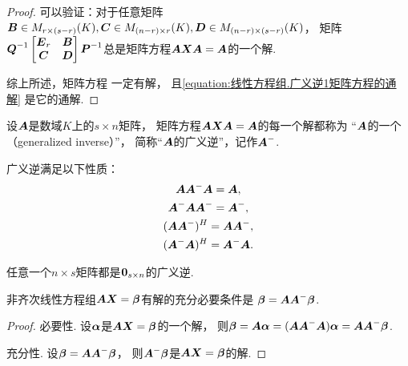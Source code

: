 \begin{theorem}[广义逆存在定理]
\begin{proof}
可以验证：对于任意矩阵\(
	\boldsymbol{B} \in M_{r \times (s-r)}(K),
	\boldsymbol{C} \in M_{(n-r) \times r}(K),
	\boldsymbol{D} \in M_{(n-r) \times (s-r)}(K)
\)，
矩阵\(
	\boldsymbol{Q}^{-1}
	\begin{bmatrix}
		\boldsymbol{E}_r & \boldsymbol{B} \\
		\boldsymbol{C} & \boldsymbol{D}
	\end{bmatrix}
	\boldsymbol{P}^{-1}
\)总是矩阵方程\(\boldsymbol{A} \boldsymbol{X} \boldsymbol{A} = \boldsymbol{A}\)的一个解.

综上所述，矩阵方程  一定有解，
且\cref{equation:线性方程组.广义逆1矩阵方程的通解} 是它的通解.
\end{proof}
\end{theorem}

\begin{definition}
设\(\boldsymbol{A}\)是数域\(K\)上的\(s \times n\)矩阵，
矩阵方程\(\boldsymbol{A} \boldsymbol{X} \boldsymbol{A} = \boldsymbol{A}\)的每一个解都称为
“\(\boldsymbol{A}\)的一个（generalized inverse）”，
简称“\(\boldsymbol{A}\)的广义逆”，记作\(\boldsymbol{A}^-\).
\end{definition}

\begin{property}\label{theorem:线性方程组.广义逆的性质1}
广义逆满足以下性质：\begin{gather}
	\boldsymbol{A}\boldsymbol{A}^-\boldsymbol{A}=\boldsymbol{A}, \\
	\boldsymbol{A}^-\boldsymbol{A}\boldsymbol{A}^-=\boldsymbol{A}^-, \\
	(\boldsymbol{A}\boldsymbol{A}^-)^H=\boldsymbol{A}\boldsymbol{A}^-, \\
	(\boldsymbol{A}^-\boldsymbol{A})^H=\boldsymbol{A}^-\boldsymbol{A}.
\end{gather}
\end{property}

\begin{property}\label{theorem:线性方程组.广义逆的性质2}
任意一个\(n \times s\)矩阵都是\(\boldsymbol0_{s \times n}\)的广义逆.
\end{property}

\begin{theorem}[非齐次线性方程组的相容性定理]\label{theorem:线性方程组.非齐次线性方程组的相容性定理}
非齐次线性方程组\(\boldsymbol{A} \boldsymbol{X} = \boldsymbol\beta\)有解的充分必要条件是
\(\boldsymbol\beta = \boldsymbol{A} \boldsymbol{A}^- \boldsymbol\beta\).
\begin{proof}
必要性.
设\(\boldsymbol\alpha\)是\(\boldsymbol{A} \boldsymbol{X} = \boldsymbol\beta\)的一个解，
则\(
	\boldsymbol\beta
	= \boldsymbol{A} \boldsymbol\alpha
	= (\boldsymbol{A} \boldsymbol{A}^- \boldsymbol{A}) \boldsymbol\alpha
	= \boldsymbol{A} \boldsymbol{A}^- \boldsymbol\beta
\).

充分性.
设\(\boldsymbol\beta = \boldsymbol{A} \boldsymbol{A}^- \boldsymbol\beta\)，
则\(\boldsymbol{A}^- \boldsymbol\beta\)是\(\boldsymbol{A} \boldsymbol{X} = \boldsymbol\beta\)的解.
\end{proof}
\end{theorem}


